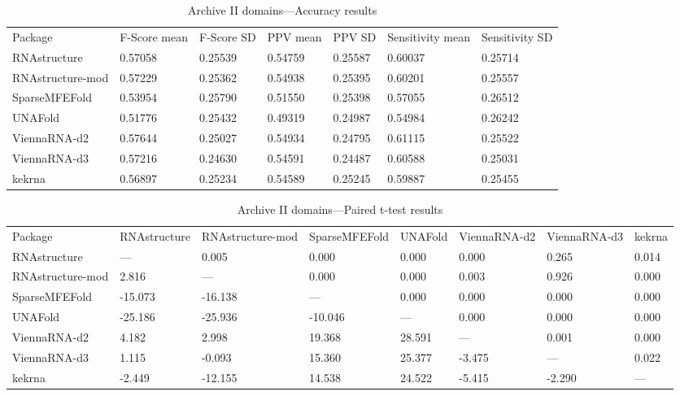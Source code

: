 \documentclass{cshonours}
\begin{document}
\begin{landscape}
\begin{table}
\begin{adjustbox}{center}
\begin{tabular}{lllllll}
Package & F-Score mean & F-Score SD & PPV mean & PPV SD & Sensitivity mean & Sensitivity SD \\
RNAstructure & 0.57058 & 0.25539 & 0.54759 & 0.25587 & 0.60037 & 0.25714 \\
RNAstructure-mod & 0.57229 & 0.25362 & 0.54938 & 0.25395 & 0.60201 & 0.25557 \\
SparseMFEFold & 0.53954 & 0.25790 & 0.51550 & 0.25398 & 0.57055 & 0.26512 \\
UNAFold & 0.51776 & 0.25432 & 0.49319 & 0.24987 & 0.54984 & 0.26242 \\
ViennaRNA-d2 & 0.57644 & 0.25027 & 0.54934 & 0.24795 & 0.61115 & 0.25522 \\
ViennaRNA-d3 & 0.57216 & 0.24630 & 0.54591 & 0.24487 & 0.60588 & 0.25031 \\
kekrna & 0.56897 & 0.25234 & 0.54589 & 0.25245 & 0.59887 & 0.25455 \\
\end{tabular}
\end{adjustbox}
\caption{Archive II domains---Accuracy results}
\label{table:archiveii}
\end{table}

\begin{table}
\begin{adjustbox}{center}
\begin{tabular}{llllllll}
Package & RNAstructure & RNAstructure-mod & SparseMFEFold & UNAFold & ViennaRNA-d2 & ViennaRNA-d3 & kekrna \\
RNAstructure & --- & 0.005 & 0.000 & 0.000 & 0.000 & 0.265 & 0.014 \\
RNAstructure-mod & 2.816 & --- & 0.000 & 0.000 & 0.003 & 0.926 & 0.000 \\
SparseMFEFold & -15.073 & -16.138 & --- & 0.000 & 0.000 & 0.000 & 0.000 \\
UNAFold & -25.186 & -25.936 & -10.046 & --- & 0.000 & 0.000 & 0.000 \\
ViennaRNA-d2 & 4.182 & 2.998 & 19.368 & 28.591 & --- & 0.001 & 0.000 \\
ViennaRNA-d3 & 1.115 & -0.093 & 15.360 & 25.377 & -3.475 & --- & 0.022 \\
kekrna & -2.449 & -12.155 & 14.538 & 24.522 & -5.415 & -2.290 & --- \\
\end{tabular}
\end{adjustbox}
\caption{Archive II domains---Paired t-test results}
\label{table:archiveii_ttest}
\end{table}
\end{landscape}
\end{document}
